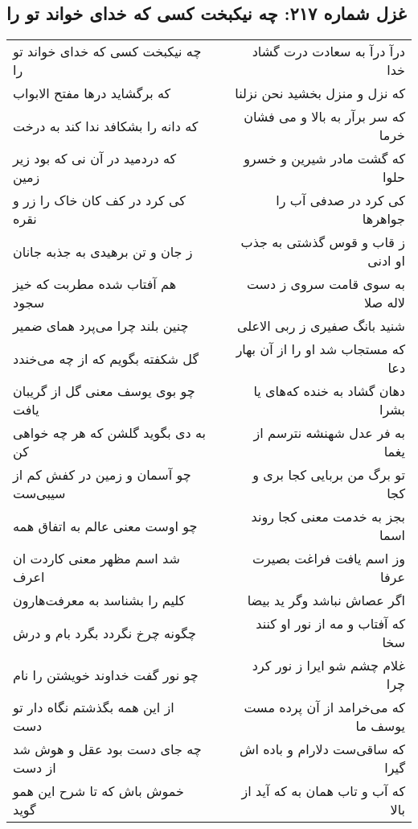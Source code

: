 \begin{center}
\section*{غزل شماره ۲۱۷: چه نیکبخت کسی که خدای خواند تو را}
\label{sec:0217}
\begin{longtable}{l p{0.5cm} r}
چه نیکبخت کسی که خدای خواند تو را
&&
درآ درآ به سعادت درت گشاد خدا
\\
که برگشاید درها مفتح الابواب
&&
که نزل و منزل بخشید نحن نزلنا
\\
که دانه را بشکافد ندا کند به درخت
&&
که سر برآر به بالا و می فشان خرما
\\
که دردمید در آن نی که بود زیر زمین
&&
که گشت مادر شیرین و خسرو حلوا
\\
کی کرد در کف کان خاک را زر و نقره
&&
کی کرد در صدفی آب را جواهرها
\\
ز جان و تن برهیدی به جذبه جانان
&&
ز قاب و قوس گذشتی به جذب او ادنی
\\
هم آفتاب شده مطربت که خیز سجود
&&
به سوی قامت سروی ز دست لاله صلا
\\
چنین بلند چرا می‌پرد همای ضمیر
&&
شنید بانگ صفیری ز ربی الاعلی
\\
گل شکفته بگویم که از چه می‌خندد
&&
که مستجاب شد او را از آن بهار دعا
\\
چو بوی یوسف معنی گل از گریبان یافت
&&
دهان گشاد به خنده که‌های یا بشرا
\\
به دی بگوید گلشن که هر چه خواهی کن
&&
به فر عدل شهنشه نترسم از یغما
\\
چو آسمان و زمین در کفش کم از سیبی‌ست
&&
تو برگ من بربایی کجا بری و کجا
\\
چو اوست معنی عالم به اتفاق همه
&&
بجز به خدمت معنی کجا روند اسما
\\
شد اسم مظهر معنی کاردت ان اعرف
&&
وز اسم یافت فراغت بصیرت عرفا
\\
کلیم را بشناسد به معرفت‌هارون
&&
اگر عصاش نباشد وگر ید بیضا
\\
چگونه چرخ نگردد بگرد بام و درش
&&
که آفتاب و مه از نور او کنند سخا
\\
چو نور گفت خداوند خویشتن را نام
&&
غلام چشم شو ایرا ز نور کرد چرا
\\
از این همه بگذشتم نگاه دار تو دست
&&
که می‌خرامد از آن پرده مست یوسف ما
\\
چه جای دست بود عقل و هوش شد از دست
&&
که ساقی‌ست دلارام و باده اش گیرا
\\
خموش باش که تا شرح این همو گوید
&&
که آب و تاب همان به که آید از بالا
\\
\end{longtable}
\end{center}
